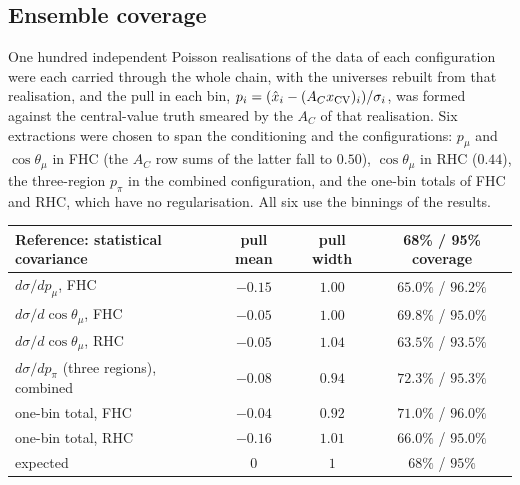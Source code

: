 \documentclass[11pt,a4paper]{article}
\begin{document}
\subsection{Ensemble coverage}
\label{par:ensemble}

One hundred independent Poisson realisations of the data of each configuration were each carried
through the whole chain, with the universes rebuilt from that realisation, and the pull in each bin,
$p_i=(\hat{x}_i-(A_C x_{\rm CV})_i)/\sigma_i$, was formed against the central-value truth smeared by
the $A_C$ of that realisation. Six extractions were chosen to span the conditioning and the
configurations: $p_\mu$ and $\cos\theta_\mu$ in FHC (the $A_C$ row sums of the latter fall to
$0.50$), $\cos\theta_\mu$ in RHC ($0.44$), the three-region $p_\pi$ in the combined configuration,
and the one-bin totals of FHC and RHC, which have no regularisation. All six use the binnings of
the results.

\begin{center}
\small
\begin{tabular}{lccc}
\toprule
Reference: statistical covariance & pull mean & pull width & 68\% / 95\% coverage \\
\midrule
$d\sigma/dp_\mu$, FHC                    & $-0.15$ & $1.00$ & $65.0\%$ / $96.2\%$ \\
$d\sigma/d\cos\theta_\mu$, FHC           & $-0.05$ & $1.00$ & $69.8\%$ / $95.0\%$ \\
$d\sigma/d\cos\theta_\mu$, RHC           & $-0.05$ & $1.04$ & $63.5\%$ / $93.5\%$ \\
$d\sigma/dp_\pi$ (three regions), combined & $-0.08$ & $0.94$ & $72.3\%$ / $95.3\%$ \\
one-bin total, FHC                       & $-0.04$ & $0.92$ & $71.0\%$ / $96.0\%$ \\
one-bin total, RHC                       & $-0.16$ & $1.01$ & $66.0\%$ / $95.0\%$ \\
\midrule
expected                & $0$     & $1$    & $68\%$ / $95\%$ \\
\bottomrule
\end{tabular}
\end{center}
\end{document}
